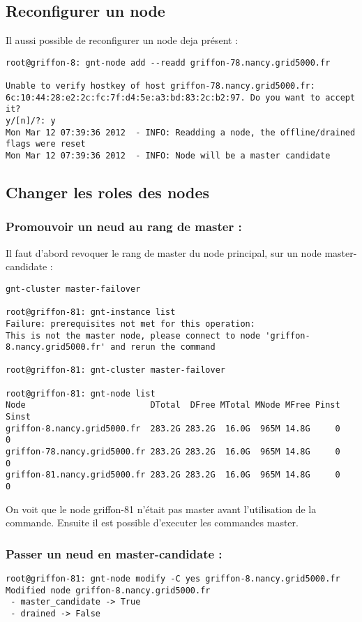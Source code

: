 \subsection{Reconfigurer un node}
Il aussi possible de reconfigurer un node deja présent :
\begin{lstlisting}
root@griffon-8: gnt-node add --readd griffon-78.nancy.grid5000.fr

Unable to verify hostkey of host griffon-78.nancy.grid5000.fr:
6c:10:44:28:e2:2c:fc:7f:d4:5e:a3:bd:83:2c:b2:97. Do you want to accept
it?
y/[n]/?: y
Mon Mar 12 07:39:36 2012  - INFO: Readding a node, the offline/drained flags were reset
Mon Mar 12 07:39:36 2012  - INFO: Node will be a master candidate
\end{lstlisting}
\subsection{Changer les roles des nodes}

\subsubsection {Promouvoir un neud au rang de master :}
Il faut d'abord revoquer le rang de master du node principal, sur un node master-candidate :
\begin{lstlisting}
gnt-cluster master-failover

root@griffon-81: gnt-instance list
Failure: prerequisites not met for this operation:
This is not the master node, please connect to node 'griffon-8.nancy.grid5000.fr' and rerun the command

root@griffon-81: gnt-cluster master-failover

root@griffon-81: gnt-node list
Node                         DTotal  DFree MTotal MNode MFree Pinst Sinst
griffon-8.nancy.grid5000.fr  283.2G 283.2G  16.0G  965M 14.8G     0     0
griffon-78.nancy.grid5000.fr 283.2G 283.2G  16.0G  965M 14.8G     0     0
griffon-81.nancy.grid5000.fr 283.2G 283.2G  16.0G  965M 14.8G     0     0
\end{lstlisting}
On voit que le node griffon-81 n'était pas master avant l'utilisation de la commande. Ensuite il est possible d'executer les commandes master.
\subsubsection{Passer un neud en master-candidate :}
\begin{lstlisting}
root@griffon-81: gnt-node modify -C yes griffon-8.nancy.grid5000.fr
Modified node griffon-8.nancy.grid5000.fr
 - master_candidate -> True
 - drained -> False
\end{lstlisting}
